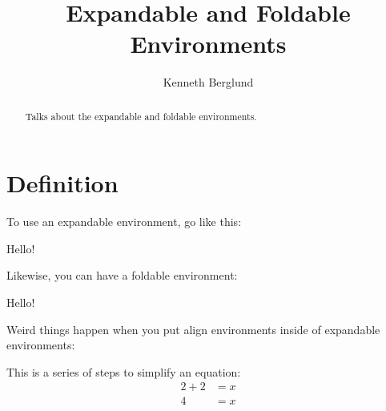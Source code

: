 \documentclass{ximera}
\title{Expandable and Foldable Environments}
\author{Kenneth Berglund}
\begin{document}
\begin{abstract}
Talks about the expandable and foldable environments. 
\end{abstract}
\maketitle

\section{Definition}

To use an expandable environment, go like this:
\begin{expandable}
Hello!
\end{expandable}

Likewise, you can have a foldable environment:
\begin{foldable}
Hello!
\end{foldable}

Weird things happen when you put align\* environments inside of expandable environments:

\begin{expandable}
This is a series of steps to simplify an equation:
\begin{align*}
2 + 2 & = x \\
4 & = x
\end{align*}
\end{expandable}
\end{document}
